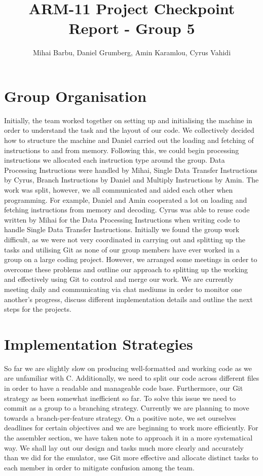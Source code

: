 \documentclass[11pt]{article}
\begin{document}
\title{ARM-11 Project Checkpoint Report - Group 5}
\author{Mihai Barbu, Daniel Grumberg, Amin Karamlou, Cyrus Vahidi}

\maketitle

\section{Group Organisation}

Initially, the team worked together on setting up and initialising the machine in order to understand the task and the layout of our code. We collectively decided how to structure the machine and  Daniel carried out the loading and fetching of instructions to and from memory.
Following this, we could begin processing instructions  we allocated each instruction type around the group. Data Processing Instructions were handled by Mihai, Single Data Transfer Instructions by Cyrus, Branch Instructions by Daniel and Multiply Instructions by Amin. The work was split, however, we all communicated and aided each other when programming. For example, Daniel and Amin cooperated a lot on loading and fetching instructions from memory and decoding. Cyrus was able to reuse code written by Mihai for the Data Processing Instructions when writing code to handle Single Data Transfer Instructions. 
Initially we found the group work difficult, as we were not very coordinated in carrying out and splitting up the tasks and utilising Git as none of our group members have ever worked in a group on a large coding project. However, we arranged some meetings in order to overcome these problems and outline our approach to splitting up the working and effectively using Git to control and merge our work. We are currently meeting daily and communicating via chat mediums in order to monitor one another's progress, discuss different implementation details and outline the next steps for the projects.

\section{Implementation Strategies}

So far we are slightly slow on producing well-formatted and working code as we are unfamiliar with C. Additionally, we need to split our code across different files in order to have a readable and manageable code base. Furthermore, our Git strategy as been somewhat inefficient so far. To solve this issue we need to commit as a group to a branching strategy. Currently we are planning to move towards a branch-per-feature strategy. On a positive note, we set ourselves deadlines for certain objectives and we are beginning to work more efficiently. For the assembler section, we have taken note to approach it in a more systematical way. We shall lay out our design and tasks much more clearly and accurately than we did for the emulator, use Git more effective and allocate distinct tasks to each member in order to mitigate confusion among the team.
\end{document}
